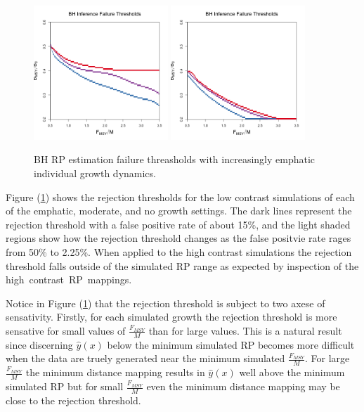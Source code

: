 \begin{figure}
\includegraphics[width=0.45\textwidth]{../ddBias/relErrorImagesBHDD0.5.png}
\includegraphics[width=0.45\textwidth]{../ddBias/relErrorImagesBHDD0.01.png}
\caption{BH RP estimation failure threasholds with increasingly emphatic individual growth dynamics.
}\label{breaks}
\end{figure}
%
Figure (\ref{breaks}) shows the rejection thresholds for the low contrast
simulations of each of the emphatic, moderate, and no growth settings. %
The dark lines represent the rejection threshold with a false positive rate
of about 15\%, and the light shaded regions show how the rejection threshold
changes as the false positvie rate rages from 50\% to 2.25\%.
When applied to the high contrast simulations the rejection threshold falls
outside of the simulated RP range as expected by inspection of the
\mbox{high contrast RP mappings.}

%
Notice in Figure (\ref{breaks}) that the rejection threshold is subject to two
axese of sensativity. Firstly, for each simulated growth the rejection
threshold is more sensative for small values of $\frac{F_{MSY}}{M}$ than for
large values. This is a natural result since discerning $\hat y(x)$ below the
minimum simulated RP becomes more difficult when the data are truely generated
near the minimum simulated $\frac{F_{MSY}}{M}$.
For large $\frac{F_{MSY}}{M}$ the minimum distance mapping results in $\hat y(x)$
well above the minimum simulated RP but for small $\frac{F_{MSY}}{M}$ even the
minimum distance mapping may be close to the rejection threshold.

